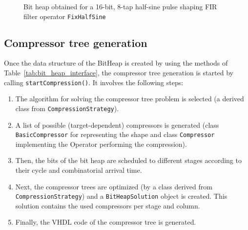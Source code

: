 \documentclass{article}
\begin{document}
\begin{figure}[t]
  \centering
    \scalebox{0.28} {
      \begin{dotdiag}{20}
        \begin{scope}
        \end{scope}
      \end{dotdiag}
    }
  \caption{Bit heap obtained for a 16-bit, 8-tap half-sine pulse shaping FIR filter operator \texttt{FixHalfSine}}
  \label{fig:bitheapgallery-halfsine}
\end{figure}

\subsection{Compressor tree generation}

Once the data structure of the BitHeap is created by using the methods of Table~\ref{tab:bit_heap_interface}, the compressor tree generation is started by calling \texttt{startCompression()}.
It involves the following steps:
\begin{enumerate}
	\item The algorithm for solving the compressor tree problem is selected (a derived class from \texttt{CompressionStrategy}).
	\item A list of possible (target-dependent) compressors is generated (class \texttt{BasicCompressor} for representing the shape and class \texttt{Compressor} implementing the Operator performing the compression).
	\item Then, the bits of the bit heap are scheduled to different stages according to their cycle and combinatorial arrival time.
	\item Next, the compressor trees are optimized (by a class derived from \texttt{CompressionStrategy}) and a \texttt{BitHeapSolution} object is created. This solution contains the used compressors per stage and column.
	\item Finally, the VHDL code of the compressor tree is generated.
\end{enumerate}
\end{document}
